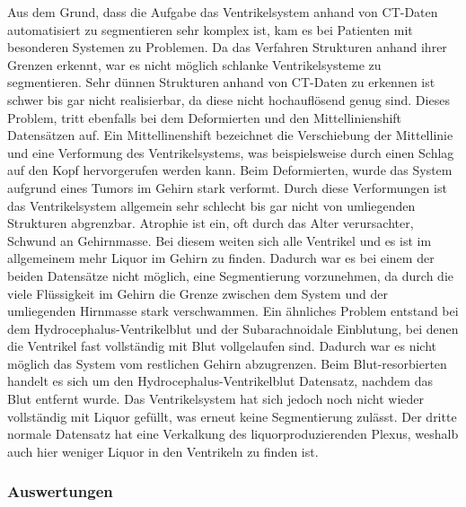 Aus dem Grund, dass die Aufgabe das Ventrikelsystem anhand von CT-Daten automatisiert zu segmentieren sehr komplex ist, kam es bei Patienten mit besonderen Systemen zu Problemen.
Da das Verfahren Strukturen anhand ihrer Grenzen erkennt, war es nicht möglich schlanke Ventrikelsysteme zu segmentieren. Sehr dünnen Strukturen anhand von CT-Daten zu erkennen ist schwer bis gar nicht realisierbar, da diese nicht hochauflösend genug sind. Dieses Problem, tritt ebenfalls bei dem Deformierten und den Mittellinienshift Datensätzen auf. Ein Mittellinenshift bezeichnet die Verschiebung der Mittellinie und eine Verformung des Ventrikelsystems, was beispielsweise durch einen Schlag auf den Kopf hervorgerufen werden kann. Beim Deformierten, wurde das System aufgrund eines Tumors im Gehirn stark verformt. Durch diese Verformungen ist das Ventrikelsystem allgemein sehr schlecht bis gar nicht von umliegenden Strukturen abgrenzbar.
\newline
Atrophie ist ein, oft durch das Alter verursachter, Schwund an Gehirnmasse. Bei diesem weiten sich alle Ventrikel und es ist im allgemeinem mehr Liquor im Gehirn zu finden. Dadurch war es bei einem der beiden Datensätze nicht möglich, eine Segmentierung vorzunehmen, da durch die viele Flüssigkeit im Gehirn die Grenze zwischen dem System und der umliegenden Hirnmasse stark verschwammen.
Ein ähnliches Problem entstand bei dem Hydrocephalus-Ventrikelblut und der Subarachnoidale Einblutung, bei denen die Ventrikel fast vollständig mit Blut vollgelaufen sind. Dadurch war es nicht möglich das System vom restlichen Gehirn abzugrenzen.
Beim Blut-resorbierten  handelt es sich um den Hydrocephalus-Ventrikelblut Datensatz, nachdem das Blut entfernt wurde. Das Ventrikelsystem hat sich jedoch noch nicht wieder vollständig mit Liquor gefüllt, was erneut keine Segmentierung zulässt.
Der dritte normale Datensatz hat eine Verkalkung des liquorproduzierenden Plexus, weshalb auch hier weniger Liquor in den Ventrikeln zu finden ist.



\subsubsection{Auswertungen}

